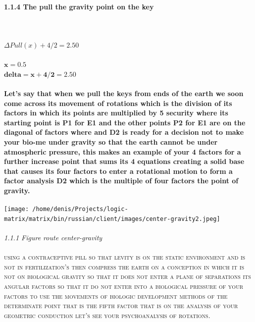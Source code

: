 \paragraph{1.1.4 The pull the gravity point on the key}
\textbf{\\\\}
$\Delta{Pull(x) + 4 / 2 = 2.50}$
\textbf{\\\\}
$\mathbf{x = 0.5}$
\textbf{\\}
$\mathbf{delta = x + 4 / 2 = 2.50}$
\textbf{\\\\}
\textbf{Let's say that when we pull the keys from ends of the earth we soon come across its movement of rotations which is the division of its factors in which its points are multiplied by 5 security where its starting point is P1 for E1 and the other points P2 for E1 are on the diagonal of factors where and D2 is ready for a decision not to make your bio-me under gravity so that the earth cannot be under atmospheric pressure, this makes an example of your 4 factors for a further increase point that sums its 4 equations creating a solid base that causes its four factors to enter a rotational motion to form a factor analysis D2 which is the multiple of four factors the point of gravity.}
\textbf{\\\\}
\texttt{[image: /home/denis/Projects/logic-matrix/matrix/bin/russian/client/images/center-gravity2.jpeg]}
\textbf{\\\\}
\textit{1.1.1 Figure route center-gravity}
\textbf{\\\\}
\textsc{using a contraceptive pill so that levity is on the static environment and is not in fertilization's then compress the earth on a conception in which it is not on biological gravity so that it does not enter a plane of separations its angular factors so that it do not enter into a biological pressure of your factors to use the movements of biologic development methods of the determinate point that is the fifth factor that is on the analysis of your geometric conduction let's see your psychoanalysis of rotations.}
\textbf{\\\\}
